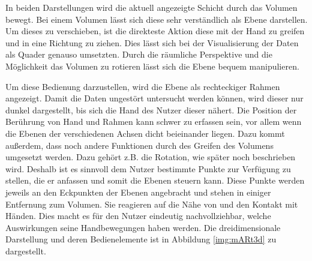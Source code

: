 In beiden Darstellungen wird die aktuell angezeigte Schicht durch das Volumen bewegt. Bei einem Volumen lässt sich diese sehr verständlich als Ebene darstellen. Um dieses zu verschieben, ist die direkteste Aktion diese mit der Hand zu greifen und in eine Richtung zu ziehen. 
Dies lässt sich bei der Visualisierung der Daten als Quader genauso umsetzten. Durch die räumliche Perspektive und die Möglichkeit das Volumen zu rotieren lässt sich die Ebene bequem manipulieren. 

Um diese Bedienung darzustellen, wird die Ebene als rechteckiger Rahmen angezeigt. Damit die Daten ungestört untersucht werden können, wird dieser nur dunkel dargestellt, bis sich die Hand des Nutzer dieser nähert. 
Die Position der Berührung von Hand und Rahmen kann schwer zu erfassen sein, vor allem wenn die Ebenen der verschiedenen Achsen dicht beieinander liegen. Dazu kommt außerdem, dass noch andere Funktionen durch des Greifen des Volumens umgesetzt werden. Dazu gehört z.B. die Rotation, wie später noch beschrieben wird. Deshalb ist es sinnvoll dem Nutzer bestimmte Punkte zur Verfügung zu stellen, die er anfassen und somit die Ebenen steuern kann. Diese Punkte werden jeweils an den Eckpunkten der Ebenen angebracht und stehen in einiger Entfernung zum Volumen. Sie reagieren auf die Nähe von und den Kontakt mit Händen. Dies macht es für den Nutzer eindeutig nachvollziehbar, welche Auswirkungen seine Handbewegungen haben werden. 
Die dreidimensionale Darstellung und deren Bedienelemente ist in Abbildung \ref{img:mARt3d} zu dargestellt.

